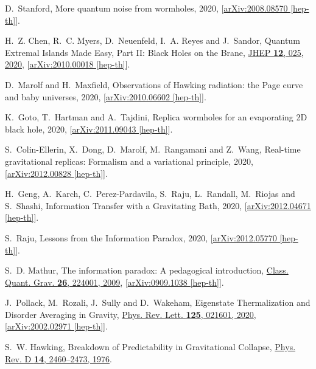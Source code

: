\documentclass[12pt]{article}
\numberwithin{equation}{section}
\begin{document}
\begin{thebibliography}{10}
D.~Stanford, {{More quantum noise from wormholes}},  2020,
  [\href{http://arxiv.org/abs/arXiv:2008.08570}{{arXiv:2008.08570 [hep-th]}}].

H.~Z. Chen, R.~C. Myers, D.~Neuenfeld, I.~A. Reyes and J.~Sandor, {{Quantum
  Extremal Islands Made Easy, Part II: Black Holes on the Brane}},
  \href{http://dx.doi.org/10.1007/JHEP12(2020)025}{JHEP {\bf 12}, 025, 2020},
  [\href{http://arxiv.org/abs/arXiv:2010.00018}{{arXiv:2010.00018 [hep-th]}}].

D.~Marolf and H.~Maxfield, {{Observations of Hawking radiation: the Page curve
  and baby universes}},  2020,
  [\href{http://arxiv.org/abs/arXiv:2010.06602}{{arXiv:2010.06602 [hep-th]}}].

K.~Goto, T.~Hartman and A.~Tajdini, {{Replica wormholes for an evaporating 2D
  black hole}},  2020,
  [\href{http://arxiv.org/abs/arXiv:2011.09043}{{arXiv:2011.09043 [hep-th]}}].

S.~Colin-Ellerin, X.~Dong, D.~Marolf, M.~Rangamani and Z.~Wang, {{Real-time
  gravitational replicas: Formalism and a variational principle}},  2020,
  [\href{http://arxiv.org/abs/arXiv:2012.00828}{{arXiv:2012.00828 [hep-th]}}].

H.~Geng, A.~Karch, C.~Perez-Pardavila, S.~Raju, L.~Randall, M.~Riojas and
  S.~Shashi, {{Information Transfer with a Gravitating Bath}},  2020,
  [\href{http://arxiv.org/abs/arXiv:2012.04671}{{arXiv:2012.04671 [hep-th]}}].

S.~Raju, {{Lessons from the Information Paradox}},  2020,
  [\href{http://arxiv.org/abs/arXiv:2012.05770}{{arXiv:2012.05770 [hep-th]}}].

S.~D. Mathur, {{The information paradox: A pedagogical introduction}},
  \href{http://dx.doi.org/10.1088/0264-9381/26/22/224001}{Class. Quant. Grav.
  {\bf 26}, 224001, 2009},
  [\href{http://arxiv.org/abs/arXiv:0909.1038}{{arXiv:0909.1038 [hep-th]}}].

J.~Pollack, M.~Rozali, J.~Sully and D.~Wakeham, {{Eigenstate Thermalization and
  Disorder Averaging in Gravity}},
  \href{http://dx.doi.org/10.1103/PhysRevLett.125.021601}{Phys. Rev. Lett. {\bf
  125}, 021601, 2020},
  [\href{http://arxiv.org/abs/arXiv:2002.02971}{{arXiv:2002.02971 [hep-th]}}].

S.~W. Hawking, {{Breakdown of Predictability in Gravitational Collapse}},
  \href{http://dx.doi.org/10.1103/PhysRevD.14.2460}{Phys. Rev. D {\bf 14},
  2460--2473, 1976}.


\end{thebibliography}
\end{document}
